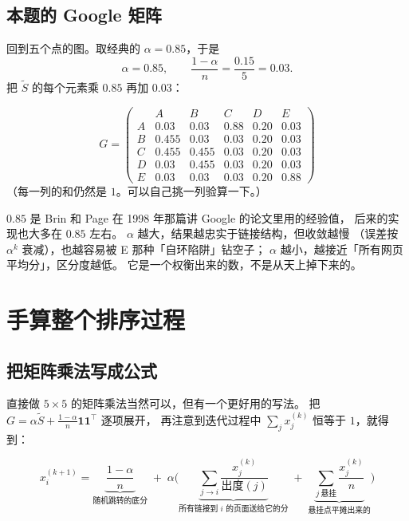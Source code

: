 \documentclass[UTF8,11pt,fontset=macnew]{ctexart}
\newcommand{\one}{\mathbf{1}}
\begin{document}
\subsection{本题的 Google 矩阵}

回到五个点的图。取经典的 $\alpha=0.85$，于是
\[
\alpha=0.85,\qquad \frac{1-\alpha}{n}=\frac{0.15}{5}=0.03 .
\]
把 $\tilde S$ 的每个元素乘 $0.85$ 再加 $0.03$：

\[
G=\left(\begin{array}{c|ccccc}
   & A & B & C & D & E\\ \hline
A  & 0.03  & 0.03  & 0.88  & 0.20 & 0.03\\[1mm]
B  & 0.455 & 0.03  & 0.03  & 0.20 & 0.03\\[1mm]
C  & 0.455 & 0.455 & 0.03  & 0.20 & 0.03\\[1mm]
D  & 0.03  & 0.455 & 0.03  & 0.20 & 0.03\\[1mm]
E  & 0.03  & 0.03  & 0.03  & 0.20 & 0.88
\end{array}\right)
\]
（每一列的和仍然是 $1$。可以自己挑一列验算一下。）

\begin{warnbox}
$0.85$ 是 Brin 和 Page 在 1998 年那篇讲 Google 的论文里用的经验值，
后来的实现也大多在 $0.85$ 左右。
$\alpha$ 越大，结果越忠实于链接结构，但收敛越慢
（误差按 $\alpha^k$ 衰减），也越容易被 E 那种「自环陷阱」钻空子；
$\alpha$ 越小，越接近「所有网页平均分」，区分度越低。
它是一个权衡出来的数，不是从天上掉下来的。
\end{warnbox}

\section{手算整个排序过程}

\subsection{把矩阵乘法写成公式}

直接做 $5\times5$ 的矩阵乘法当然可以，但有一个更好用的写法。
把 $G=\alpha\tilde S+\frac{1-\alpha}{n}\one\one^\top$ 逐项展开，
再注意到迭代过程中 $\sum_j x_j^{(k)}$ 恒等于 $1$，就得到：

\[
x_i^{(k+1)}
=\underbrace{\frac{1-\alpha}{n}}_{\text{随机跳转的底分}}
\;+\;\alpha\Bigg(
\underbrace{\sum_{j\to i}\frac{x_j^{(k)}}{\text{出度}(j)}}_{\text{所有链接到 } i \text{ 的页面送给它的分}}
\;+\;\underbrace{\sum_{j\ \text{悬挂}}\frac{x_j^{(k)}}{n}}_{\text{悬挂点平摊出来的}}\Bigg)
\]
\end{document}
